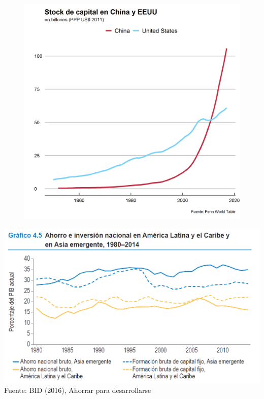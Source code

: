 \documentclass{beamer}
\begin{document}
	\begin{frame}[plain]
		\begin{figure}
			\centering
			\includegraphics[width=.8\linewidth, keepaspectratio]{capital}
		\end{figure}
	\end{frame}	

	\begin{frame}[plain]
		\centering
		\includegraphics[width=.8\linewidth, keepaspectratio]{latam} \\
		{\footnotesize{Fuente: BID (2016), Ahorrar para desarrollarse}}
	\end{frame}
\end{document}
